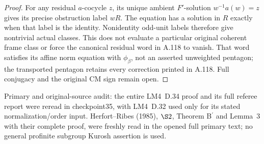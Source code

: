 \begin{proof}
For any residual \(a\)-cocycle \(z\), its unique ambient
\(F'\)-solution \(w^{-1}a(w)=z\) gives its precise obstruction
label \(wR\). The equation has a solution in \(R\) exactly
when that label is the identity. Nonidentity odd-unit labels
therefore give nontrivial actual classes.
This does not evaluate a particular original coherent
frame class or force the canonical residual word in A.118
to vanish. That word satisfies its affine norm equation
with \(\phi_\beta\), not an asserted unweighted pentagon;
the transported pentagon retains every correction printed
in A.118. Full conjugacy and the original CM sign remain open.
\end{proof}

\begingroup\footnotesize\raggedright
Primary and original-source audit: the entire LM4~D.34 proof
and its full referee report were reread in checkpoint35, with
LM4~D.32 used only for its stated normalization/order input.
Herfort--Ribes (1985), \(\S2\), Theorem B\(^{\prime}\) and
Lemma~3 with their complete proof, were freshly read in the
opened full primary text; no general profinite
subgroup Kurosh assertion is used.\par\endgroup
